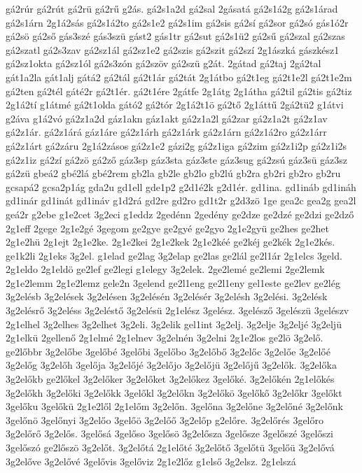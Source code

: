 {gá2rúr
gá2rút
gá2rü
gá2rű
g2ás.
gá2s1a2d
gá2sal
2gásatá
gá2s1á2g
gá2s1árad
gá2s1árn
2g1á2sás
gá2s1á2to
gá2s1e2
gá2s1im
gá2sis
gá2sí
gá2sor
gá2só
gás1ó2r
gá2sö
gá2ső
gás3szé
gás3szü
gást2
gás1tr
gá2sut
gá2s1ü2
gá2sű
gá2szal
gá2szas
gá2szatl
gá2s3zav
gá2sz1ál
gá2sz1e2
gá2szis
gá2szit
gá2szí
2g1ászká
gászkész1
gá2sz1okta
gá2sz1ól
gá2s3zón
gá2szöv
gá2szü
g2át.
2gátad
gá2taj
2gá2tal
gát1a2la
gát1alj
gátá2
gá2tál
gá2t1ár
gá2tát
2g1átbo
gá2t1eg
gá2t1e2l
gá2t1e2m
gá2ten
gá2tél
gáté2r
gá2t1ér.
gá2t1ére
2gátfe
2g1átg
2g1átha
gá2til
gá2tis
gá2tiz
2g1á2tí
g1átmé
gá2t1olda
gátó2
gá2tór
2g1á2t1ö
gá2tő
2g1áttű
2gá2tü2
g1átvi
g2áva
g1á2vó
gá2z1a2d
gáz1akn
gáz1akt
gá2z1a2l
gá2zar
gá2z1a2t
gá2z1av
gá2z1ár.
gá2z1árá
gáz1áre
gá2z1árh
gá2z1árk
gá2z1árn
gá2z1á2ro
gá2z1árr
gá2z1árt
gá2záru
2g1á2zásos
gá2z1e2
gázi2g
gá2z1iga
gá2zim
gá2z1i2p
gá2z1i2s
gá2z1iz
gá2zí
gá2zö
gá2ző
gáz3sp
gáz3sta
gáz3ste
gáz3sug
gá2zsú
gáz3sü
gáz3sz
gá2zü
gbeá2
gbé2lá
gbé2rem
gb2la
gb2le
gb2lo
gb2lú
gb2ra
gb2ri
gb2ro
gb2ru
gcsapá2
gcsa2p1ág
gda2u
gd1ell
gde1p2
g2d1é2k
g2d1ér.
gd1ina.
gd1ináb
gd1ináh
gd1inár
gd1inát
gd1ináv
g1d2rá
gd2re
gd2ro
gd1t2r
g2d3zö
1ge
gea2c
gea2g
gea2l
geá2r
g2ebe
g1e2cet
3g2eci
g1eddz
2gedénn
2gedény
ge2dze
ge2dzé
ge2dzi
ge2dző
2g1eff
2gege
2g1e2gé
3gegom
ge2gye
ge2gyé
ge2gyo
2g1e2gyü
ge2hes
ge2het
2g1e2hü
2g1ejt
2g1e2ke.
2g1e2kei
2g1e2kek
2g1e2kéé
ge2kéj
ge2kék
2g1e2kés.
ge1k2li
2g1eks
3g2el.
g1elad
ge2lag
3g2elap
ge2las
ge2lál
ge2l1ár
2g1elcs
3geld.
2g1eldo
2g1eldö
ge2lef
ge2legi
g1elegy
3g2elek.
2ge2lemé
ge2lemi
2ge2lemk
2g1e2lemm
2g1e2lemz
gele2n
3gelend
ge2l1eng
ge2l1eny
gel1este
ge2lev
ge2lég
3g2elésb
3g2elések
3g2elésen
3g2elésén
3g2elésér
3g2elésh
3g2elési.
3g2elésk
3g2elésrő
3g2eléss
3g2eléstő
3g2elésü
2g1elész
3gelész.
3gelésző
3gelészü
3gelészv
2g1elhel
3g2elhes
3g2elhet
3g2eli.
3g2elik
gel1int
3g2elj.
3g2elje
3g2eljé
3g2eljü
2g1elkü
2gellenő
2g1elmé
2g1elnev
3g2elnén
3g2elni
2g1e2los
ge2lö
3g2elő.
ge2lőbbr
3g2előbe
3gelőbé
3gelőbi
3gelőbo
3g2előbő
3g2előc
3g2előe
3g2előé
3g2előg
3g2előh
3gelőja
3g2előjé
3g2előjo
3g2előjü
3g2előjű
3g2elők.
3g2előka
3g2előkb
ge2lőkel
3g2előker
3g2előket
3g2előkez
3gelőké.
3g2előkén
2g1előkés
3g2előkh
3g2előki
3g2előkk
3gelőkl
3g2előkn
3g2előkö
3gelőkő
3g2előkr
3gelőkt
3gelőku
3gelőkü
2g1e2lől
2g1előm
3g2előn.
3gelőna
3g2előne
3g2előné
3g2előnk
3gelőnö
3gelőnyi
3g2előo
3gelőö
3g2előő
3g2előp
g2előre.
3g2előrés
3gelőro
3g2előrő
3g2elős.
3gelősá
3gelőso
3gelősö
3g2elősza
3gelősze
3gelőszé
3gelőszi
3gelőszó
ge2lőszö
3g2előt.
3g2előtá
2g1előté
3g2előtő
3gelőtü
3gelőü
3g2elővá
3g2előve
3g2elővé
3gelővis
3gelőviz
2g1e2lőz
g1első
3g2elsz.
2g1elszá
}
